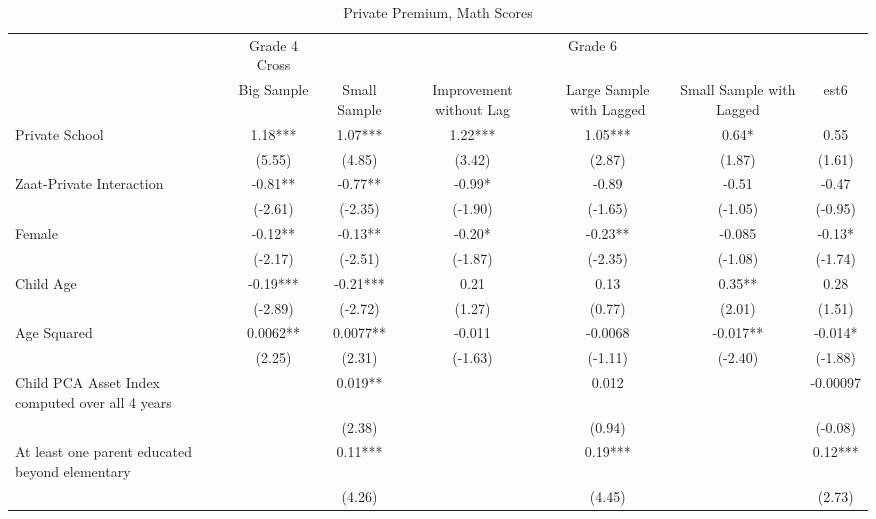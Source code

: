 \begin{sidewaystable}[htbp]\centering
\def\sym#1{\ifmmode^{#1}\else\(^{#1}\)\fi}
\caption{Private Premium, Math Scores}
\begin{tabular}{l*{6}{c}}
\toprule
                &\multicolumn{1}{c}{Grade 4 Cross}&\multicolumn{5}{c}{Grade 6}                                     \\\cmidrule(lr){2-2}\cmidrule(lr){3-7}
                &\multicolumn{1}{c}{Big Sample}&\multicolumn{1}{c}{Small Sample}&\multicolumn{1}{c}{Improvement without Lag}&\multicolumn{1}{c}{Large Sample with Lagged}&\multicolumn{1}{c}{Small Sample with Lagged}&\multicolumn{1}{c}{est6}\\
\midrule
Private School  &     1.18***&     1.07***&     1.22***&     1.05***&     0.64*  &     0.55   \\
                &   (5.55)   &   (4.85)   &   (3.42)   &   (2.87)   &   (1.87)   &   (1.61)   \\
Zaat-Private Interaction&    -0.81** &    -0.77** &    -0.99*  &    -0.89   &    -0.51   &    -0.47   \\
                &  (-2.61)   &  (-2.35)   &  (-1.90)   &  (-1.65)   &  (-1.05)   &  (-0.95)   \\
Female          &    -0.12** &    -0.13** &    -0.20*  &    -0.23** &   -0.085   &    -0.13*  \\
                &  (-2.17)   &  (-2.51)   &  (-1.87)   &  (-2.35)   &  (-1.08)   &  (-1.74)   \\
Child Age       &    -0.19***&    -0.21***&     0.21   &     0.13   &     0.35** &     0.28   \\
                &  (-2.89)   &  (-2.72)   &   (1.27)   &   (0.77)   &   (2.01)   &   (1.51)   \\
Age Squared     &   0.0062** &   0.0077** &   -0.011   &  -0.0068   &   -0.017** &   -0.014*  \\
                &   (2.25)   &   (2.31)   &  (-1.63)   &  (-1.11)   &  (-2.40)   &  (-1.88)   \\
Child PCA Asset Index computed over all 4 years&            &    0.019** &            &    0.012   &            & -0.00097   \\
                &            &   (2.38)   &            &   (0.94)   &            &  (-0.08)   \\
At least one parent educated beyond elementary&            &     0.11***&            &     0.19***&            &     0.12***\\
                &            &   (4.26)   &            &   (4.45)   &            &   (2.73)   \\

\end{tabular}
\end{sidewaystable}
